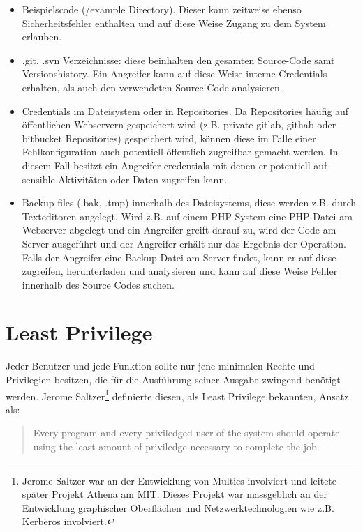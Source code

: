 \begin{itemize}
	\item Beispielscode (/example Directory). Dieser kann zeitweise ebenso Sicherheitsfehler enthalten und auf diese Weise Zugang zu dem System erlauben.
	\item .git, .svn Verzeichnisse: diese beinhalten den gesamten Source-Code samt Versionshistory. Ein Angreifer kann auf diese Weise interne Credentials erhalten, als auch den verwendeten Source Code analysieren.
	\item Credentials im Dateisystem oder in Repositories. Da Repositories häufig auf öffentlichen Webservern gespeichert wird (z.B. private gitlab, githab oder bitbucket Repositories) gespeichert wird, können diese im Falle einer Fehlkonfiguration auch potentiell öffentlich zugreifbar gemacht werden. In diesem Fall besitzt ein Angreifer credentials mit denen er potentiell auf sensible Aktivitäten oder Daten zugreifen kann.
	\item Backup files (.bak, .tmp) innerhalb des Dateisystems, diese werden z.B. durch Texteditoren angelegt. Wird z.B. auf einem PHP-System eine PHP-Datei am Webserver abgelegt und ein Angreifer greift darauf zu, wird der Code am Server ausgeführt und der Angreifer erhält nur das Ergebnis der Operation. Falls der Angreifer eine Backup-Datei am Server findet, kann er auf diese zugreifen, herunterladen und analysieren und kann auf diese Weise Fehler innerhalb des Source Codes suchen.
\end{itemize}

\section{Least Privilege}

Jeder Benutzer und jede Funktion sollte nur jene minimalen Rechte und Privilegien besitzen, die für die Ausführung seiner Ausgabe zwingend benötigt werden. Jerome Saltzer\footnote{Jerome Saltzer war an der Entwicklung von Multics involviert und leitete später Projekt Athena am MIT. Dieses Projekt war massgeblich an der Entwicklung graphischer Oberflächen und Netzwerktechnologien wie z.B. Kerberos involviert.} definierte diesen, als Least Privilege bekannten, Ansatz als:

\begin{quote}
Every program and every priviledged user of the system should operate using the least amount of priviledge necessary to complete the job.
\end{quote}

